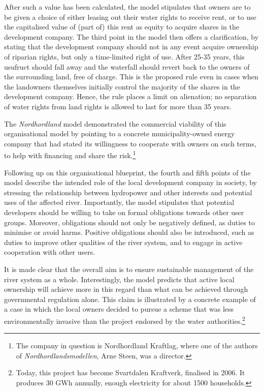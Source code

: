 After such a value has been calculated, the model stipulates that owners are to be given a choice of either leasing out their water rights to receive rent, or to use the capitalised value of (part of) this rent as equity to acquire shares in the development company. The third point in the model then offers a clarification, by stating that the development company should not in any event acquire ownership of riparian rights, but only a time-limited right of use. After 25-35 years, this usufruct should fall away and the waterfall should revert back to the owners of the surrounding land, free of charge. This is the proposed rule even in cases when the landowners themselves initially control the majority of the shares in the development company. Hence, the rule places a limit on alienation; no separation of water rights from land rights is allowed to last for more than 35 years. 

The {\it Nordhordland} model demonstrated the commercial viability of this organisational model by pointing to a concrete municipality-owned energy company that had stated its willingness to cooperate with owners on such terms, to help with financing and share the risk.\footnote{The company in question is Nordhordland Kraftlag, where one of the authors of {\it Nordhordlandsmodellen}, Arne Steen, was a director.} 

Following up on this organisational blueprint, the fourth and fifth points of the model describe the intended role of the local development company in society, by stressing the relationship between hydropower and other interests and potential uses of the affected river. Importantly, the model stipulates that potential developers should be willing to take on formal obligations towards other user groups. Moreover, obligations should not only be negatively defined, as duties to minimise or avoid harms. Positive obligations should also be introduced, such as duties to improve other qualities of the river system, and to engage in active cooperation with other users.

It is made clear that the overall aim is to ensure sustainable management of the river system as a whole. Interestingly, the model predicts that active local ownership will achieve more in this regard than what can be achieved through governmental regulation alone. This claim is illustrated by a concrete example of a case in which the local owners decided to pursue a scheme that was less environmentally invasive than the project endorsed by the water authorities.\footnote{Today, this project has become Svartdalen Kraftverk, finalised in 2006. It produces 30 GWh annually, enough electricity for about 1500 households.}

